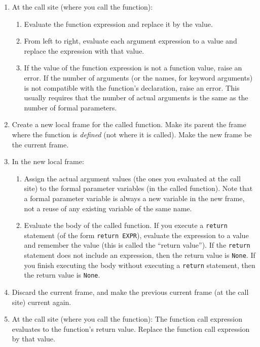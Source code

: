 \documentclass{article}
\newcommand{\expr}[1]{\texttt{#1}}
\newcommand{\kw}[1]{\expr{#1}}
\begin{document}
\begin{enumerate}
\item
  At the call site (where you call the function):

  \begin{enumerate}
  \item
    Evaluate the function
    expression and replace it by the value.
  \item
    From left to right, evaluate each argument expression to a value and
    replace the expression with that value.
  \item
    If the value of the function expression is not a function value, raise
    an error.  If the number of arguments (or the names, for keyword
    arguments) is not compatible with the function's declaration, raise an
    error.  This usually requires that the number of actual arguments is
    the same as the number of formal parameters.
  \end{enumerate}

\item
  Create a new local frame for the called function.
  Make its parent the frame where the function is \emph{defined} (not where it is called).
  Make the new frame be the current frame.

\item
  In the new local frame:

  \begin{enumerate}
  \item
    Assign the actual argument values (the ones you evaluated at the call
    site) to the formal parameter variables (in the called function).  Note
    that a formal parameter variable is always a new variable in the new
    frame, not a reuse of any existing variable of the same name.

  \item
    Evaluate the body of the called function.  If you execute a \kw{return}
    statement (of the form \expr{return EXPR}), evaluate the expression to
    a value and remember the value (this is called the ``return value'').
    If the \kw{return} statement does not include an expression, then the
    return value is \kw{None}.  If you finish executing the body without
    executing a \kw{return} statement, then the return value is \kw{None}.
  \end{enumerate}

\item
  Discard the current frame, and make the previous current frame (at the
  call site) current again.

\item
  At the call site (where you call the function):
  The function call expression evaluates to the
  function's return value.  Replace the function call expression by that value.

\end{enumerate}
\end{document}
